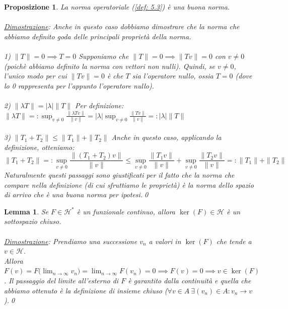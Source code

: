 \documentclass[a4paper,12pt]{report}
\newtheorem{proposizione}{Proposizione}[chapter]
\newtheorem{lemma}{Lemma}[chapter]
\begin{document}
\begin{proposizione}\label{app: A.4}
    La norma operatoriale (\ref{def: 5.3}) è una buona norma.
    \\
    \\\underline{Dimostrazione}: Anche in questo caso dobbiamo dimostrare che la norma che abbiamo definito goda delle principali proprietà della norma.
    \\
    \\ 1) $\boxed{\|T\|=0\implies T=0}$ Supponiamo che $\|T\|=0\implies \|Tv\|=0$ con $v\neq 0$ (poichè abbiamo definito la norma con vettori non nulli). Quindi, se $v\ne 0$, l'unico modo per cui $\|Tv\|=0$ è che $T$ sia l'operatore nullo, ossia $T=0$ (dove lo 0 rappresenta per l'appunto l'operatore nullo).
    \\
    \\ 2) $\boxed{\|\lambda T \|=|\lambda|\|T\|}$ Per definizione: $\|\lambda T\|=:\displaystyle\sup_{v\neq 0}\frac{\|\lambda Tv\|}{\|v\|}=|\lambda|\sup_{v\neq 0}\frac{\|Tv\|}{\|v\|}=:|\lambda|\|T\|$
    \\
    \\ 3) $\boxed{\|T_1+T_2\|\leq\|T_1\|+\|T_2\|}$ Anche in questo caso, applicando la definizione, otteniamo:
    \[\|T_1+T_2\|=:\displaystyle\sup_{v\neq0}\frac{\|(T_1+T_2)v\|}{\|v\|}\leq\sup_{v\neq0}\frac{\|T_1v\|}{\|v\|}+\sup_{v\neq0}\frac{\|T_2v\|}{\|v\|}=:\|T_1\|+\|T_2\|\]
    Naturalmente questi passaggi sono giustificati per il fatto che la norma che compare nella definizione (di cui sfruttiamo le proprietà) è la norma dello spazio di arrivo che è una buona norma per ipotesi.\qed
\end{proposizione}

\begin{lemma}\label{app: A.6}
    Se $F\in \mathscr{H}^*$ è un funzionale continuo, allora $\ker(F)\in \mathscr{H}$ è un sottospazio chiuso.
    \\
    \\\underline{Dimostrazione}: Prendiamo una successione $v_n$ a valori in $\ker(F)$ che tende a $v\in \mathscr{H}$. 
    \\Allora $\displaystyle F(v)=F\bigg(\lim_{n\to \infty}v_n\bigg)=\lim_{n\to\infty}F(v_n)=0\implies F(v)=0\implies v\in \ker(F)$. Il passaggio del limite all'esterno di $F$ è garantito dalla continuità e quella che abbiamo ottenuto è la definizione di insieme chiuso ($\forall v\in A\  \exists(v_n)\in A: v_n\to v$).\qed
\end{lemma}

\newpage
\end{document}
